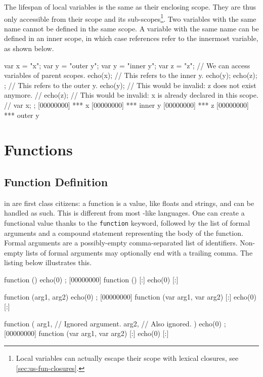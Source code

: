 The lifespan of local variables is the same as their enclosing scope. They
are thus only accessible from their scope and its
sub-scopes\footnote{Local variables can actually escape their scope
  with lexical closures, see \autoref{sec:us-fun-closures}.}. Two
variables with the same name cannot be defined in the same scope. A
variable with the same name can be defined in an inner scope, in which
case references refer to the innermost variable, as shown below.

\begin{urbiscript}
{
  var x = "x";
  var y = "outer y";
  {
    var y = "inner y";
    var z = "z";
    // We can access variables of parent scopes.
    echo(x);
    // This refers to the inner y.
    echo(y);
    echo(z);
  };
  // This refers to the outer y.
  echo(y);
  // This would be invalid: z does not exist anymore.
  // echo(z);
  // This would be invalid: x is already declared in this scope.
  // var x;
};
[00000000] *** x
[00000000] *** inner y
[00000000] *** z
[00000000] *** outer y
\end{urbiscript}


\section{Functions}

\subsection{Function Definition}

 in \us are first class citizens: a function is a
value, like floats and strings, and can be handled as such.  This is
different from most \C-like languages.  One can create a functional
value thanks to the \lstinline|function| keyword, followed by the list
of formal arguments and a compound statement representing the body of
the function. Formal arguments are a possibly-empty comma-separated
list of identifiers.  Non-empty lists of formal arguments may
optionally end with a trailing comma. The listing below illustrates
this.

\begin{urbiscript}
function () { echo(0) };
[00000000] function () {
[:]  echo(0)
[:]}

function (arg1, arg2) { echo(0) };
[00000000] function (var arg1, var arg2) {
[:]  echo(0)
[:]}

function (
           arg1, // Ignored argument.
           arg2, // Also ignored.
          )
{
  echo(0)
};
[00000000] function (var arg1, var arg2) {
[:]  echo(0)
[:]}
\end{urbiscript}

